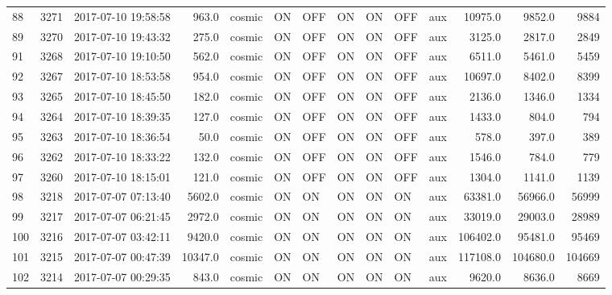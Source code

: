 \begin{longtable}{lrlrlllllllrrr}
88  &  3271 &  2017-07-10 19:58:58 &     963.0 &   cosmic &  ON &  OFF &   ON &  ON &  OFF &       aux &     10975.0 &       9852.0 &                9884 \\
89  &  3270 &  2017-07-10 19:43:32 &     275.0 &   cosmic &  ON &  OFF &   ON &  ON &  OFF &       aux &      3125.0 &       2817.0 &                2849 \\
91  &  3268 &  2017-07-10 19:10:50 &     562.0 &   cosmic &  ON &  OFF &   ON &  ON &  OFF &       aux &      6511.0 &       5461.0 &                5459 \\
92  &  3267 &  2017-07-10 18:53:58 &     954.0 &   cosmic &  ON &  OFF &   ON &  ON &  OFF &       aux &     10697.0 &       8402.0 &                8399 \\
93  &  3265 &  2017-07-10 18:45:50 &     182.0 &   cosmic &  ON &  OFF &   ON &  ON &  OFF &       aux &      2136.0 &       1346.0 &                1334 \\
94  &  3264 &  2017-07-10 18:39:35 &     127.0 &   cosmic &  ON &  OFF &   ON &  ON &  OFF &       aux &      1433.0 &        804.0 &                 794 \\
95  &  3263 &  2017-07-10 18:36:54 &      50.0 &   cosmic &  ON &  OFF &   ON &  ON &  OFF &       aux &       578.0 &        397.0 &                 389 \\
96  &  3262 &  2017-07-10 18:33:22 &     132.0 &   cosmic &  ON &  OFF &   ON &  ON &  OFF &       aux &      1546.0 &        784.0 &                 779 \\
97  &  3260 &  2017-07-10 18:15:01 &     121.0 &   cosmic &  ON &  OFF &   ON &  ON &  OFF &       aux &      1304.0 &       1141.0 &                1139 \\
98  &  3218 &  2017-07-07 07:13:40 &    5602.0 &   cosmic &  ON &   ON &   ON &  ON &   ON &       aux &     63381.0 &      56966.0 &               56999 \\
99  &  3217 &  2017-07-07 06:21:45 &    2972.0 &   cosmic &  ON &   ON &   ON &  ON &   ON &       aux &     33019.0 &      29003.0 &               28989 \\
100 &  3216 &  2017-07-07 03:42:11 &    9420.0 &   cosmic &  ON &   ON &   ON &  ON &   ON &       aux &    106402.0 &      95481.0 &               95469 \\
101 &  3215 &  2017-07-07 00:47:39 &   10347.0 &   cosmic &  ON &   ON &   ON &  ON &   ON &       aux &    117108.0 &     104680.0 &              104669 \\
102 &  3214 &  2017-07-07 00:29:35 &     843.0 &   cosmic &  ON &   ON &   ON &  ON &   ON &       aux &      9620.0 &       8636.0 &                8669 \\

\end{longtable}
